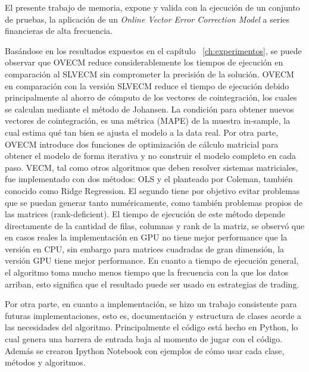 El presente trabajo de memoria, expone y valida con la ejecución de un conjunto
de pruebas, la aplicación de un  \emph{Online Vector Error Correction Model} a
series financieras de alta frecuencia.

Basándose en los resultados expuestos en el capítulo ~\ref{ch:experimentos}, se
puede observar que OVECM reduce considerablemente los tiempos de ejecución en
comparación al SLVECM sin comprometer la precisión de la solución. OVECM en
comparación con la versión SLVECM reduce el tiempo de ejecución debido
principalmente al ahorro de cómputo de los vectores de cointegración, los
cuales se calculan mediante el método de Johansen. 
La condición para obtener nuevos vectores de cointegración, es una métrica
(MAPE) de la muestra in-sample, la cual estima qué tan bien se ajusta el modelo
a la data real. Por otra parte, OVECM introduce dos funciones de optimización
de cálculo matricial para obtener el modelo de forma iterativa y no construir
el modelo completo en cada paso.  
VECM, tal como otros algoritmos que deben resolver sistemas matriciales, fue
implementado con dos métodos: OLS y el planteado por Coleman, también conocido
como Ridge Regression. El segundo tiene por objetivo evitar problemas que se
puedan generar tanto numéricamente, como también problemas propios de las
matrices (rank-deficient). El tiempo de ejecución de este método depende
directamente de la cantidad de filas, columnas y rank de la matriz, se observó
que en casos reales la implementación en GPU no tiene mejor performance que la
versión en CPU, sin embargo para matrices cuadradas de gran dimensión, la
versión GPU tiene mejor performance.
En cuanto a tiempo de ejecución general, el algoritmo toma mucho menos tiempo
que la frecuencia con la que los datos arriban, esto significa que el resultado
puede ser usado en estrategias de trading.

Por otra parte, en cuanto a implementación, se hizo un trabajo consistente para
futuras implementaciones, esto es, documentación y estructura de clases acorde
a las necesidades del algoritmo. Principalmente el código está hecho en Python,
lo cual genera una barrera de entrada baja al momento de jugar con el código.
Además se crearon Ipython Notebook con ejemplos de cómo usar cada clase,
métodos y algoritmos.

\newpage
